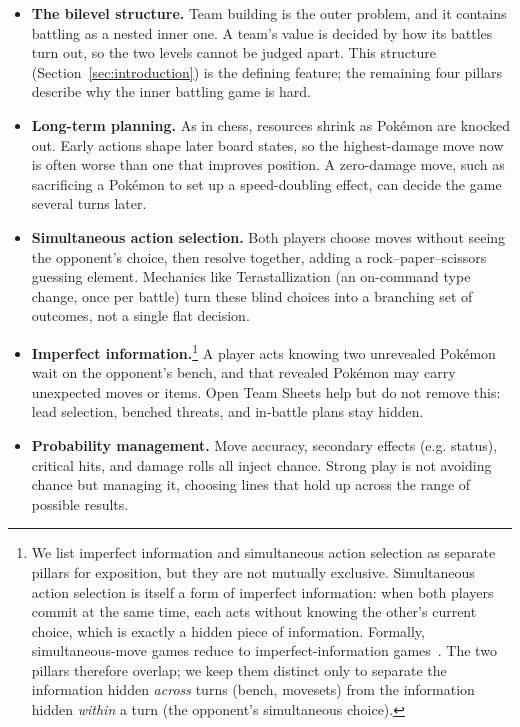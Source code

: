 \begin{itemize}
  \item \textbf{The bilevel structure.} Team building is the outer problem, and it
        contains battling as a nested inner one. A team's value is decided by how
        its battles turn out, so the two levels cannot be judged apart. This
        structure (Section~\ref{sec:introduction}) is the defining feature; the
        remaining four pillars describe why the inner battling game is hard.
  \item \textbf{Long-term planning.} As in chess, resources shrink as Pok\'{e}mon
        are knocked out. Early actions shape later board states, so the
        highest-damage move now is often worse than one that improves position.
        A zero-damage move, such as sacrificing a Pok\'{e}mon to set up a
        speed-doubling effect, can decide the game several turns later.
  \item \textbf{Simultaneous action selection.} Both players choose moves without
        seeing the opponent's choice, then resolve together, adding a
        rock--paper--scissors guessing element. Mechanics like Terastallization
        (an on-command type change, once per battle) turn these blind choices into
        a branching set of outcomes, not a single flat decision.
  \item \textbf{Imperfect information.}\footnote{We list imperfect information and
        simultaneous action selection as separate pillars for exposition, but they
        are not mutually exclusive. Simultaneous action selection is itself a form
        of imperfect information: when both players commit at the same time, each
        acts without knowing the other's current choice, which is exactly a hidden
        piece of information. Formally, simultaneous-move games reduce to
        imperfect-information games~\cite{sokota2023abstractingimperfectinformationaway}. The two pillars
        therefore overlap; we keep them distinct only to separate the information
        hidden \emph{across} turns (bench, movesets) from the information hidden
        \emph{within} a turn (the opponent's simultaneous choice).} A player acts
        knowing two unrevealed Pok\'{e}mon wait on the opponent's bench, and that
        revealed Pok\'{e}mon may carry unexpected moves or items. Open Team Sheets
        help but do not remove this: lead selection, benched threats, and in-battle
        plans stay hidden.
  \item \textbf{Probability management.} Move accuracy, secondary effects (e.g.
        status), critical hits, and damage rolls all inject chance. Strong play
        is not avoiding chance but managing it, choosing lines that hold up across
        the range of possible results.
\end{itemize}

